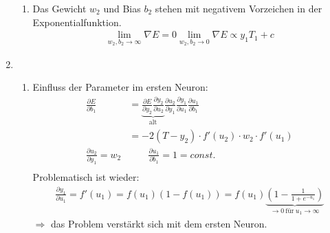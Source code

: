 \documentclass{article}
\begin{document}
\begin{enumerate}
\begin{enumerate}[label = \alph*)]
          \item Das Gewicht $w_2$ und Bias $b_2$ stehen mit negativem Vorzeichen in der Exponentialfunktion.
                \begin{align*}
                  \lim_{w_2,b_2 \to \infty} \nabla E = 0 \lim_{w_2, b_2 \to 0} \nabla E \propto y_1 T_1 + c
                \end{align*}
        \end{enumerate}
  \item
        \begin{enumerate}[label=\alph*)]
          \item Einfluss der Parameter im ersten Neuron:
                \begin{align*}
                  \frac{\partial E }{\partial b_1}        & = \underbrace{\frac{\partial E}{\partial y_2} \frac{\partial y_2}{\partial u_2}}_{\text{alt}} \frac{\partial u_2}{\partial y_1} \frac{\partial y_1}{\partial u_1} \frac{\partial u_1}{\partial b_1} \\
                                                          & = -2(T-y_2) \cdot f'(u_2) \cdot w_2 \cdot f'(u_1)                                                                                                                                                   \\
                  \frac{\partial u_2}{\partial y_1} = w_2 & \qquad \frac{\partial u_1}{\partial b_1} = 1 = \textit{const.}                                                                                                                                      \\
                \end{align*}
                Problematisch ist wieder:
                \begin{align*}
                  \frac{\partial y_1}{\partial u_1} = f'(u_1) = f(u_1)(1-f(u_1)) = f(u_1) \underbrace{(1-\frac{1}{1+e^{-u_1}})}_{\to 0\ \text{für}\ u_1 \to \infty}
                \end{align*}
                $\Rightarrow$ das Problem verstärkt sich mit dem ersten Neuron.


\end{enumerate}
\end{enumerate}
\end{document}
